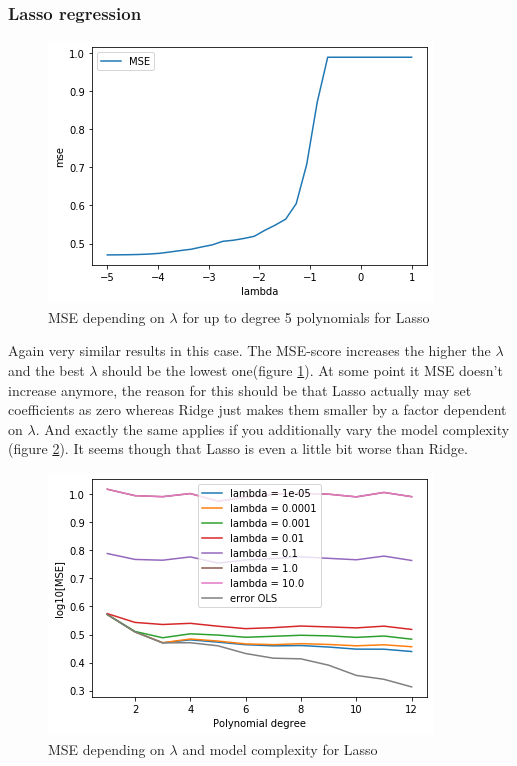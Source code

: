\documentclass[12pt]{extarticle}
\begin{document}
\subsubsection{Lasso regression}

\begin{figure}
    \centering
    \includegraphics{lasso_lambda}
    \caption{MSE depending on $\lambda$ for up to degree 5 polynomials for Lasso}
    \label{fig:t6}
\end{figure}

Again very similar results in this case. The MSE-score increases the higher the $\lambda$ and the best $\lambda$ should be the lowest one(figure \ref{fig:t6}). At some point it MSE doesn't increase anymore, the reason for this should be that Lasso actually may set coefficients as zero whereas Ridge just makes them smaller by a factor dependent on $\lambda$. And exactly the same applies if you additionally vary the model complexity (figure \ref{fig:t7}). It seems though that Lasso is even a little bit worse than Ridge.

\begin{figure}
    \centering
    \includegraphics{lasso_lambdas_complexity}
    \caption{MSE depending on $\lambda$ and model complexity for Lasso}
    \label{fig:t7}
\end{figure}
\end{document}
